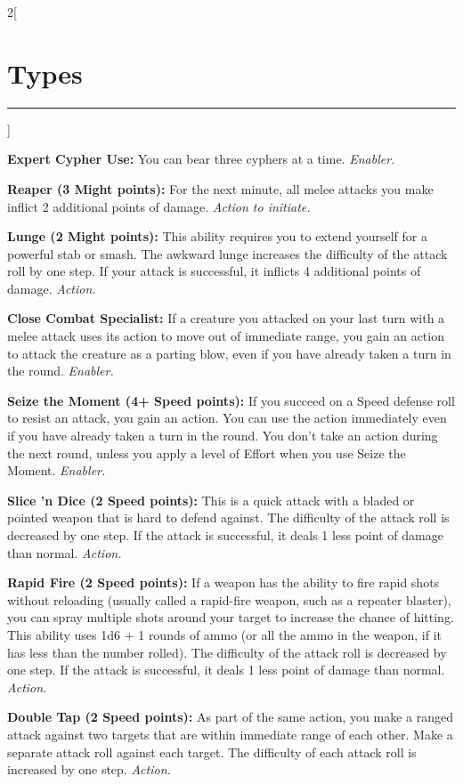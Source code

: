 \documentclass[a4paper,10pt,final]{book}
\newcommand{\HRule}{\rule{\linewidth}{0.5mm}} %
\newcommand{\newSection}[1]{\section*{#1} \addcontentsline{toc}{section}{#1} \label{sec:#1} \HRule}
\newcommand{\itemAbility}[2]{\textcolor{25gray}{\textbullet\textbf{ #1:}} {#2}\par}
\newcommand{\enabler}{\textit{ Enabler.}}
\newcommand{\action}{\textit{ Action.}}
\newcommand{\actionInit}{\textit{ Action to initiate.}}
\newenvironment{docsection}[1]
{
  \begin{multicols*}{2}[\newSection{#1}]
}
{
  \end{multicols*}
  \newpage
}
\begin{document}
\begin{docsection}{Types}
\itemAbility{Expert Cypher Use}{You can bear three cyphers at a time.\enabler}

\itemAbility{Reaper (3 Might points)}{For the next minute, all melee attacks you make inflict 2 additional points of damage.\actionInit}

\itemAbility{Lunge (2 Might points)}{This ability requires you to extend yourself for a powerful stab or smash. The awkward lunge increases the difficulty of the attack roll by one step. If your attack is successful, it inflicts 4 additional points of damage.\action}

\itemAbility{Close Combat Specialist}{If a creature you attacked on your last turn with a melee attack uses its action to move out of immediate range, you gain an action to attack the creature as a parting blow, even if you have already taken a turn in the round.\enabler}

\itemAbility{Seize the Moment (4+ Speed points)}{If you succeed on a Speed defense roll to resist an attack, you gain an action. You can use the action immediately even if you have already taken a turn in the round. You don’t take an action during the next round, unless you apply a level of Effort when you use Seize the Moment.\enabler}

\itemAbility{Slice 'n Dice (2 Speed points)}{This is a quick attack with a bladed or pointed weapon that is hard to defend against. The difficulty of the attack roll is decreased by one step. If the attack is successful, it deals 1 less point of damage than normal.\action}

\itemAbility{Rapid Fire (2 Speed points)}{If a weapon has the ability to fire rapid shots without reloading (usually called a rapid-fire weapon, such as a repeater blaster), you can spray multiple shots around your target to increase the chance of hitting. This ability uses 1d6 + 1 rounds of ammo (or all the ammo in the weapon, if it has less than the number rolled). The difficulty of the attack roll is decreased by one step. If the attack is successful, it deals 1 less point of damage than normal.\action}

\itemAbility{Double Tap (2 Speed points)}{As part of the same action, you make a ranged attack against two targets that are within immediate range of each other. Make a separate attack roll against each target. The difficulty of each attack roll is increased by one step.\action}



\end{docsection}
\end{document}
